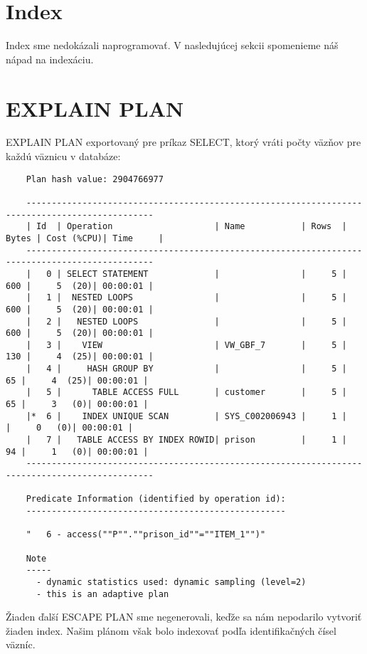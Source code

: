 \documentclass[a4paper]{article}
\begin{document}
  \section{Index}
  Index sme nedokázali naprogramovať. V nasledujúcej sekcii spomenieme náš nápad
  na indexáciu.


  \section{EXPLAIN PLAN}
  EXPLAIN PLAN exportovaný pre príkaz SELECT, ktorý vráti počty väzňov pre každú
  väznicu v databáze:

  \begin{verbatim}
    Plan hash value: 2904766977

    -----------------------------------------------------------------------------------------------
    | Id  | Operation                    | Name           | Rows  | Bytes | Cost (%CPU)| Time     |
    -----------------------------------------------------------------------------------------------
    |   0 | SELECT STATEMENT             |                |     5 |   600 |     5  (20)| 00:00:01 |
    |   1 |  NESTED LOOPS                |                |     5 |   600 |     5  (20)| 00:00:01 |
    |   2 |   NESTED LOOPS               |                |     5 |   600 |     5  (20)| 00:00:01 |
    |   3 |    VIEW                      | VW_GBF_7       |     5 |   130 |     4  (25)| 00:00:01 |
    |   4 |     HASH GROUP BY            |                |     5 |    65 |     4  (25)| 00:00:01 |
    |   5 |      TABLE ACCESS FULL       | customer       |     5 |    65 |     3   (0)| 00:00:01 |
    |*  6 |    INDEX UNIQUE SCAN         | SYS_C002006943 |     1 |       |     0   (0)| 00:00:01 |
    |   7 |   TABLE ACCESS BY INDEX ROWID| prison         |     1 |    94 |     1   (0)| 00:00:01 |
    -----------------------------------------------------------------------------------------------

    Predicate Information (identified by operation id):
    ---------------------------------------------------

    "   6 - access(""P"".""prison_id""=""ITEM_1"")"

    Note
    -----
      - dynamic statistics used: dynamic sampling (level=2)
      - this is an adaptive plan
  \end{verbatim}

  Žiaden ďalší ESCAPE PLAN sme negenerovali, keďže sa nám nepodarilo vytvoriť 
  žiaden index. Našim plánom však bolo indexovať podľa identifikačných čísel
  väzníc.
\end{document}
